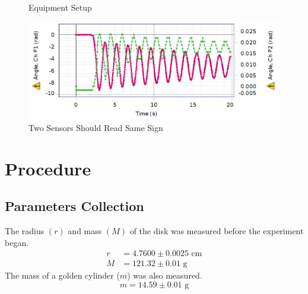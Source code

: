 \begin{figure}[h]
\begin{minipage}[c]{0.4\linewidth}
		\caption{Equipment Setup}
	\end{minipage}
	\hfill
	\begin{minipage}[c]{0.5\linewidth}
		\includegraphics[width=\linewidth]{sign}
		\caption{Two Sensors Should Read Same Sign}
	\end{minipage}%
\end{figure}


\section{Procedure}
\subsection{Parameters Collection}
The radius $(r)$ and mass $(M)$ of the disk was measured before the experiment began.
\begin{equation}
\begin{aligned}
r &= 4.7600 \pm 0.0025 \text{ cm}\\
M &= 121.32 \pm 0.01 \text{ g}
\end{aligned}
\end{equation}
The mass of a golden cylinder ($m$) was also measured.
\begin{equation}
m = 14.59\pm0.01\text{ g}
\end{equation}

